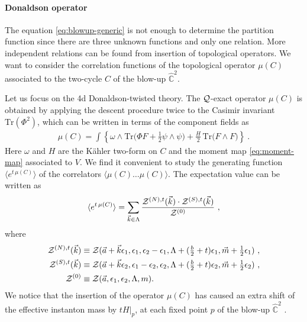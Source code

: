\documentclass[letterpaper, 11pt]{article}
\def\IC{\mathbb{C}}
\def\CQ{{\cal Q}}
\def\CZ{{\cal Z}}
\def\e{\epsilon}
\def\half{\frac{1}{2}}
\begin{document}
\paragraph{Donaldson operator}

The equation \eqref{eq:blowup-generic} is not enough to determine the partition function since there are three unknown functions and only one relation. More independent relations can be found from insertion of topological operators.
We want to consider the correlation functions of the topological operator $\mu(C)$ associated to the two-cycle $C$ of the blow-up $\hat{\mathbb{C}}^2$. 

Let us focus on the 4d Donaldson-twisted theory. The $\CQ$-exact operator $\mu(C)$ is obtained by applying the descent procedure twice to the Casimir invariant $\text{Tr}(\Phi^2)$, which can be written in terms of the component fields as  \cite{Witten:1988ze}
\begin{align} \label{eq:muC}
  \mu(C) = \int \left\{ \omega \wedge \text{Tr}\Big(\Phi F + \half \psi \wedge \psi\Big) + \frac{H}{2}\, \text{Tr}\Big( F \wedge F \Big) \right\}  \ .
\end{align}
Here $\omega$ and $H$ are the K\"ahler two-form on $C$ and the moment map \eqref{eq:moment-map} associated to $V$.
We find it convenient to study the generating function $\langle e^{t \, \mu(C)}\rangle $ of the correlators $\langle \mu(C) \ldots \mu(C)  \rangle$. The expectation value can be written as
\begin{align}
  \langle e^{t \, \mu(C)}\rangle = \sum_{\vec{k} \in \Lambda}  \frac{\CZ^{(N),t}(\vec{k}) \cdot \CZ^{(S),t}(\vec{k})}{\CZ^{(0)}}\ , 
\end{align} 
where
\begin{align}
\begin{split}
  \CZ^{(N),t}(\vec{k}) &\equiv \CZ(\vec{a}+\vec{k} \e_1, \e_1, \e_2-\e_1, \Lambda +  (\tfrac{b}{2}+t)\e_1, \vec{m} +\tfrac{1}{2}\e_1) \ , \\
  \CZ^{(S),t}(\vec{k}) &\equiv \CZ(\vec{a}+\vec{k} \e_2, \e_1 - \e_2, \e_2, \Lambda +  (\tfrac{b}{2}+t)\e_2, \vec{m} +\tfrac{1}{2}\e_2)\ , \\
 \CZ^{(0)} &\equiv \CZ(\vec{a}, \e_1, \e_2, \Lambda, m).
\end{split}
\end{align}
We notice that the insertion of the operator $\mu(C)$ has caused an extra shift of the effective instanton mass by $tH|_p$, at each fixed point $p$ of the blow-up $\hat{\IC}^2$ \cite{Nakajima:2003pg,Nakajima:2003uh, Nakajima:2005fg}. 
\end{document}
